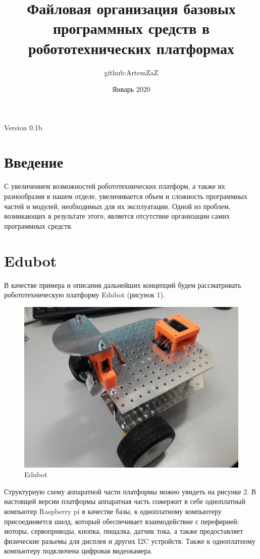 \documentclass[a4paper,12pt]{article}
\title{Файловая организация базовых программных средств в робототехнических платформах}
\author{github:ArtemZaZ}
\date{Январь 2020}
\begin{document}
\renewcommand{\baselinestretch}{1.5}
\setlength{\parindent}{5ex}

\maketitle

\begin{center}
Version 0.1b
\end{center}

\section{Введение}
С увеличением возможностей робототехнических платформ, а также их разнообразия в нашем отделе, увеличивается объем и сложность программных частей и модулей, необходимых для их эксплуатации. Одной из проблем, возникающих в результате этого, является отсутствие организации самих программных средств.     

\section{Edubot}
В качестве примера и описания дальнейших концепций будем рассматривать робототехническую платформу Edubot (рисунок 1).

\begin{figure}[h!]
\centering
\includegraphics[scale=0.15]{edubot.jpg}
\caption{Edubot}
\label{fig:edubot}
\end{figure}

Структурную схему аппаратной части платформы можно увидеть на рисунке 2. В настоящей версии платформы аппаратная часть сожержит в себе одноплатный компьютер Raspberry pi в качестве базы, к одноплатному компьютеру присоединяется шилд, который обеспечивает взаимодействие с перефирией: моторы, сервоприводы, кнопка, пищалка, датчик тока, а также предоставляет физические разьемы для дисплея и других I2C устройств. Также к одноплатному компьютеру подключена цифровая видеокамера.     
\end{document}
